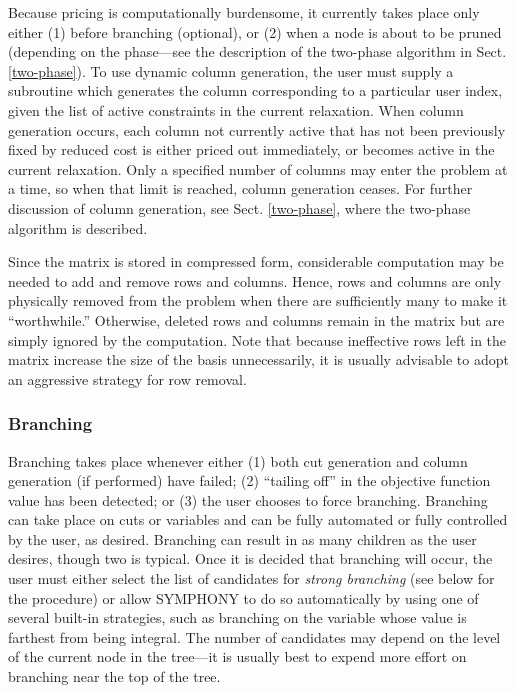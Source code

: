 Because pricing is computationally burdensome, it currently takes
place only either (1) before branching (optional), or (2) when a node
is about to be pruned (depending on the phase---see the description of
the two-phase algorithm in Sect. \ref{two-phase}). To use dynamic
column generation, the user must supply a subroutine which generates
the column corresponding to a particular user index, given the list of
active constraints in the current relaxation. When column generation
occurs, each column not currently active that has not been previously
fixed by reduced cost is either priced out immediately, or becomes
active in the current relaxation. Only a specified number of columns
may enter the problem at a time, so when that limit is reached, column
generation ceases. For further discussion of column generation, see
Sect. \ref{two-phase}, where the two-phase algorithm is described.

Since the matrix is stored in compressed form, considerable
computation may be needed to add and remove rows and columns. Hence,
rows and columns are only physically removed from the problem when
there are sufficiently many to make it ``worthwhile.'' Otherwise,
deleted rows and columns remain in the matrix but are simply ignored
by the computation. Note that because ineffective rows left in the
matrix increase the size of the basis unnecessarily, it is usually
advisable to adopt an aggressive strategy for row removal.

\subsubsection{Branching}
\label{branching}

Branching takes place whenever either (1) both cut generation and
column generation (if performed) have failed; (2) ``tailing off'' in
the objective function value has been detected; or (3) the
user chooses to force branching. Branching can take place on cuts or
variables and can be fully automated or fully controlled by the user,
as desired. Branching can result in as many children as the user
desires, though two is typical. Once it is decided that branching will
occur, the user must either select the list of candidates for {\em
strong branching} (see below for the procedure) or allow SYMPHONY to
do so automatically by using one of several built-in strategies, such
as branching on the variable whose value is farthest from being
integral. The number of candidates may depend on the level of the
current node in the tree---it is usually best to expend more effort on
branching near the top of the tree.

